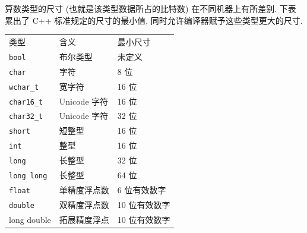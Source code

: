 \documentclass[lang=cn]{elegantbook}
\begin{document}
算数类型的尺寸 (也就是该类型数据所占的比特数) 在不同机器上有所差别. 下表累出了
C++ 标准规定的尺寸的最小值, 同时允许编译器赋予这些类型更大的尺寸.

\begin{table}[htbp]
\label{C++: 算数类型}
\centering
\begin{tabular}{lll}
类型 & 含义 & 最小尺寸\\
\texttt{bool} & 布尔类型 & 未定义\\
\texttt{char} & 字符 & 8 位\\
\texttt{wchar\_t} & 宽字符 & 16 位\\
\texttt{char16\_t} & Unicode 字符 & 16 位\\
\texttt{char32\_t} & Unicode 字符 & 32 位\\
\texttt{short} & 短整型 & 16 位\\
\texttt{int} & 整型 & 16 位\\
\texttt{long} & 长整型 & 32 位\\
\texttt{long long} & 长整型 & 64 位\\
\texttt{float} & 单精度浮点数 & 6 位有效数字\\
\texttt{double} & 双精度浮点数 & 10 位有效数字\\
long double & 拓展精度浮点 & 10 位有效数字\\
\end{tabular}
\end{table}
\end{document}
